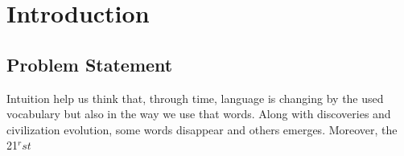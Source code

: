 \section{Introduction}

\subsection{Problem Statement}
Intuition help us think that, through time, language is changing by the used vocabulary but also in the way we use that words.
Along with discoveries and civilization evolution, some words disappear and others emerges. Moreover, the 21$^rst$ 

